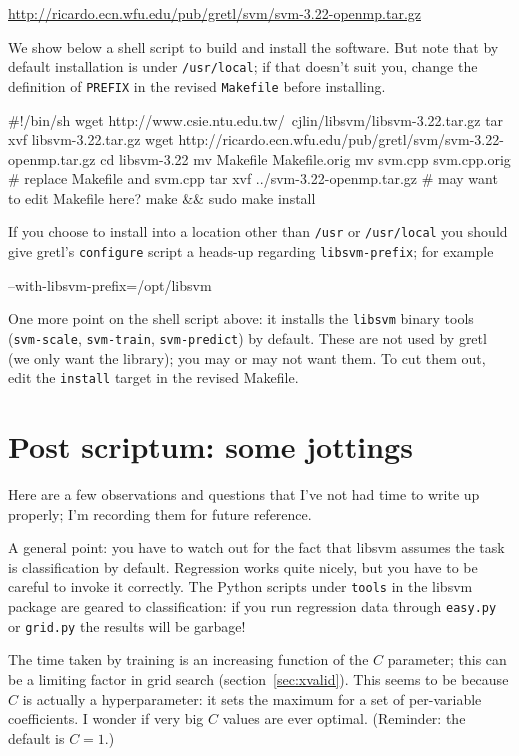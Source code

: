 \documentclass{article}
\begin{document}
\url{http://ricardo.ecn.wfu.edu/pub/gretl/svm/svm-3.22-openmp.tar.gz}

We show below a shell script to build and install the software. But
note that by default installation is under \texttt{/usr/local}; if
that doesn't suit you, change the definition of \texttt{PREFIX} in the
revised \texttt{Makefile} before installing.
\begin{code}
#!/bin/sh
wget http://www.csie.ntu.edu.tw/~cjlin/libsvm/libsvm-3.22.tar.gz
tar xvf libsvm-3.22.tar.gz
wget http://ricardo.ecn.wfu.edu/pub/gretl/svm/svm-3.22-openmp.tar.gz
cd libsvm-3.22
mv Makefile Makefile.orig
mv svm.cpp svm.cpp.orig
# replace Makefile and svm.cpp
tar xvf ../svm-3.22-openmp.tar.gz
# may want to edit Makefile here?
make && sudo make install
\end{code}

If you choose to install into a location other than \texttt{/usr} or
\texttt{/usr/local} you should give gretl's \texttt{configure} script
a heads-up regarding \texttt{libsvm-prefix}; for example
\begin{code}
--with-libsvm-prefix=/opt/libsvm
\end{code}

One more point on the shell script above: it installs the
\texttt{libsvm} binary tools (\texttt{svm-scale}, \texttt{svm-train},
\texttt{svm-predict}) by default. These are not used by gretl (we only
want the library); you may or may not want them. To cut them out, edit
the \texttt{install} target in the revised Makefile.




\section*{Post scriptum: some jottings}

Here are a few observations and questions that I've not had time to
write up properly; I'm recording them for future reference.

A general point: you have to watch out for the fact that
\textsf{libsvm} assumes the task is classification by
default. Regression works quite nicely, but you have to be careful to
invoke it correctly. The Python scripts under \texttt{tools} in the
\textsf{libsvm} package are geared to classification: if you run
regression data through \texttt{easy.py} or \texttt{grid.py} the
results will be garbage!

The time taken by training is an increasing function of the $C$
parameter; this can be a limiting factor in grid search
(section~\ref{sec:xvalid}). This seems to be because $C$ is actually a
hyperparameter: it sets the maximum for a set of per-variable
coefficients. I wonder if very big $C$ values are ever
optimal. (Reminder: the default is $C=1$.)
\end{document}
